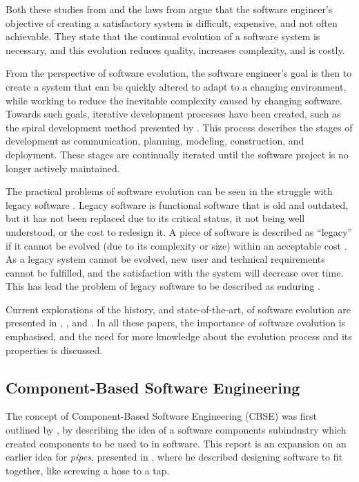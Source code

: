 Both these studies from \cite{Lientz1980} and the laws from \citep{lehman1980} argue that
the software engineer's objective of creating a satisfactory system is difficult, expensive, and not often achievable.
They state that the continual evolution of a software system is necessary, and this evolution reduces quality, increases complexity, and is costly.

From the perspective of software evolution, the software engineer's goal is then to create a system that can be quickly altered to adapt to a changing environment, 
while working to reduce the inevitable complexity caused by changing software.
Towards such goals, iterative development processes have been created, such as the spiral development method presented by \cite{Boehm1988}.
This process describes the stages of development as communication, planning, modeling, construction, and deployment. 
These stages are continually iterated until the software project is no longer actively maintained. 

The practical problems of software evolution can be seen in the struggle with legacy software \citep{Bennett1995}.
Legacy software is functional software that is old and outdated, but it has not been replaced due to its critical status, it not being well understood, or the cost to redesign it.
A piece of software is described as ``legacy'' if it cannot be evolved  (due to its complexity or size) within an acceptable cost \citep{Bisbal1999}.
As a legacy system cannot be evolved, new user and technical requirements cannot be fulfilled, and the satisfaction with the system will decrease over time.
This has lead the problem of legacy software to be described as enduring \citep{Bennett2000}. 

Current explorations of the history, and state-of-the-art, of software evolution are presented in \citep{Bennett2000}, \citep{Lehman2003}, and \citep{Godfrey2008}.
In all these papers, the importance of software evolution is emphasised, and the need for more knowledge about the evolution process and its properties is discussed.

\subsection{Component-Based Software Engineering}
The concept of Component-Based Software Engineering (CBSE) was first outlined by \cite{McIlroy1969}, 
by describing the idea of a software components subindustry which created components to be used to in software.
This report is an expansion on an earlier idea for \textit{pipes}, presented in \citep{mcilroy1964pipes}, 
where he described designing software to fit together, like screwing a hose to a tap.

